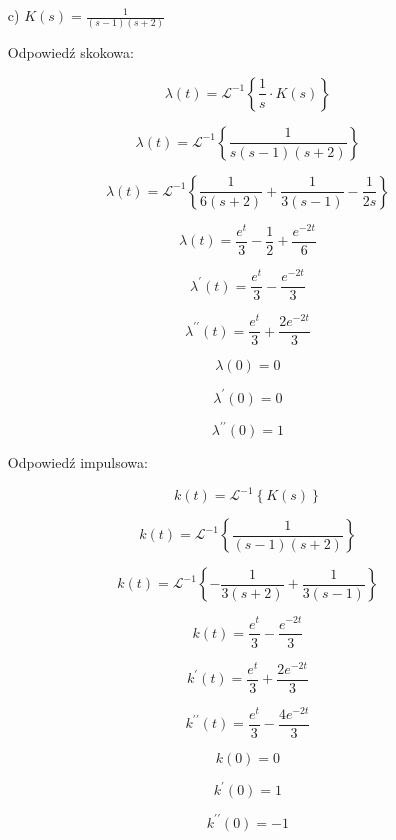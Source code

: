 \documentclass{article}
\begin{document}
\begin{enumerate}
    \newpage


    \item[c)]  $K(s)=\frac{1}{\left(s - 1\right) \left(s + 2\right)}$

    Odpowiedź skokowa:

    $$ \lambda(t)=\mathcal{L}^{-1}\left\{\frac{1}{s}\cdot K(s)\right\} $$

    $$ \lambda(t)=\mathcal{L}^{-1}\left\{\frac{1}{s \left(s - 1\right) \left(s + 2\right)}\right\} $$

    $$ \lambda(t)=\mathcal{L}^{-1}\left\{\frac{1}{6 \left(s + 2\right)} + \frac{1}{3 \left(s - 1\right)} - \frac{1}{2 s}\right\}$$

    $$ \lambda(t)=\frac{e^{t}}{3} - \frac{1}{2} + \frac{e^{- 2 t}}{6}$$

    $$ \lambda^{\prime}(t)=\frac{e^{t}}{3} - \frac{e^{- 2 t}}{3}$$

    $$ \lambda^{\prime\prime}(t)=\frac{e^{t}}{3} + \frac{2 e^{- 2 t}}{3}$$

    $$ \lambda(0)=0 $$

    $$ \lambda^{\prime}(0)=0$$

    $$ \lambda^{\prime\prime}(0)=1$$

    \newpage

    Odpowiedź impulsowa:

    $$ k(t)=\mathcal{L}^{-1}\left\{K(s)\right\} $$

    $$ k(t)=\mathcal{L}^{-1}\left\{\frac{1}{\left(s - 1\right) \left(s + 2\right)}\right\} $$

    $$ k(t)=\mathcal{L}^{-1}\left\{- \frac{1}{3 \left(s + 2\right)} + \frac{1}{3 \left(s - 1\right)}\right\} $$

    $$ k(t)=\frac{e^{t}}{3} - \frac{e^{- 2 t}}{3}$$

    $$ k^{\prime}(t)=\frac{e^{t}}{3} + \frac{2 e^{- 2 t}}{3}$$

    $$ k^{\prime\prime}(t)=\frac{e^{t}}{3} - \frac{4 e^{- 2 t}}{3}$$

    $$ k(0)=0$$

    $$ k^{\prime}(0)=1$$

    $$ k^{\prime\prime}(0)=-1$$
\end{enumerate}

\newpage
\end{document}
